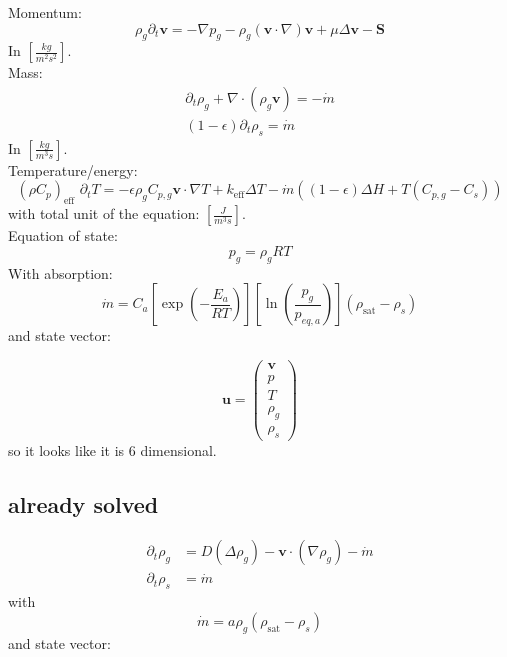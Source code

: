\documentclass{article}
\begin{document}
Momentum:
\begin{equation}
    {\rho_g \partial_t \mathbf{v}}
    ={-\nabla p_g}
    -{\rho_g (\mathbf{v}\cdot \nabla)\mathbf{v}}
    +{\mu \Delta \mathbf{v}}
    -{\mathbf{S}}
\end{equation}
In $\left[\frac{kg}{m^2s^2}\right]$.\\
Mass:
\begin{equation}
    \begin{aligned}
        {\partial_t \rho_g}+\nabla \cdot (\rho_g \mathbf{v}) = -\dot m \\
        (1-\epsilon)\partial_t \rho_s = \dot{m}
    \end{aligned}
\end{equation}
In $\left[\frac{kg}{m^3s}\right]$.\\
Temperature/energy:
\begin{equation}
    {(\rho C_{p} )}_{\text{eff}}\,\,{\partial_t T}
    = - {\epsilon \rho_g C_{p,g} \mathbf{v}\cdot \nabla T}
    + {k_{\text{eff}}\Delta T}
    -{\dot{m}((1-\epsilon)\Delta H+T(C_{p,g}-C_s)) }
\end{equation}
with total unit of the equation: $\left[\frac{J}{m^3s}\right]$. \\
Equation of state:
\begin{equation}
    p_g = \rho_g RT    
\end{equation}
With absorption:
\begin{equation}
    \dot m = C_a\left[\exp{\left(-\frac{E_a}{RT}\right)}\right]\left[ \ln\left( \frac{p_g}{p_{eq,a}}\right) \right]\left( \rho_{\text{sat}}-\rho_s\right)
\end{equation}
and state vector:

\begin{equation}
    \mathbf{u} = \begin{pmatrix}
        \mathbf{v} \\ p \\ T \\ \rho_g \\ \rho_s
    \end{pmatrix}
\end{equation}
so it looks like it is 6 dimensional.
\subsection*{already solved}

\begin{equation}
\begin{aligned}
    \partial_t\rho_g&= D(\Delta\rho_g)-\mathbf{v}\cdot(\nabla\rho_g)-\dot m \\
    \partial_t\rho_s&=\dot m
\end{aligned}
\end{equation}
with
\begin{equation}
    \dot{m}      = a\rho_g(\rho_{\text{sat}}-\rho_s)
\end{equation}
and state vector:
\end{document}
